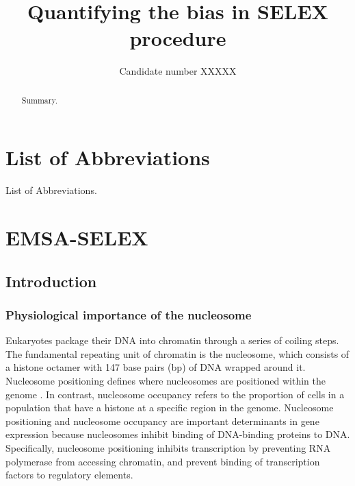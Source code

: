 \documentclass[parskip=full, numbers=noenddot]{scrreprt}
\title{Quantifying the bias in SELEX procedure}
\author{Candidate number XXXXX}
\begin{document}

\maketitle

\begin{abstract}
  
Summary.
 
\end{abstract}

\tableofcontents

\chapter*{List of Abbreviations}
\label{ch:abbrev}

List of Abbreviations.

\chapter{EMSA-SELEX}
\label{ch:emsaselex}

\section{Introduction}
\label{sec:emsaselex_intro}

\subsection{Physiological importance of the nucleosome}
\label{ssec:emsaselex_intro_importance}

Eukaryotes package their DNA into chromatin through a series of coiling steps.  The fundamental repeating unit of chromatin is the nucleosome, which consists of a histone octamer with 147 base pairs (bp) of DNA wrapped around it.  Nucleosome positioning defines where nucleosomes are positioned within the genome \citep{struhl_determinants_2013}.  In contrast, nucleosome occupancy refers to the proportion of cells in a population that have a histone at a specific region in the genome. Nucleosome positioning and nucleosome occupancy are important determinants in gene expression because nucleosomes inhibit binding of DNA-binding proteins to DNA.  Specifically, nucleosome positioning inhibits transcription by preventing RNA polymerase from accessing chromatin, and prevent binding of transcription factors to regulatory elements.
\end{document}
